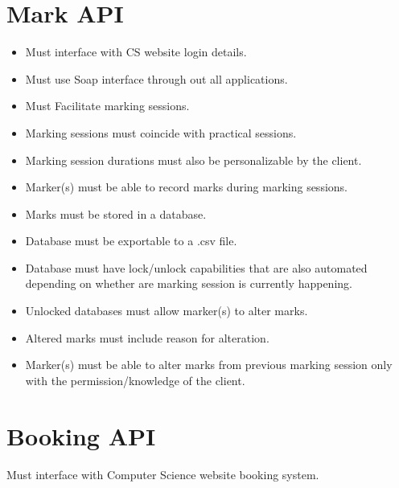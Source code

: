 \documentclass[10pt,a4paper]{article}
\begin{document}
	\section*{Mark API}
	\begin{itemize}
		\item Must interface with CS website login details.
		\item Must use Soap interface through out all applications.
		\item Must Facilitate marking sessions.
		\item Marking sessions must coincide with practical sessions.
		\item Marking session durations must also be personalizable by the client.
		\item Marker(s) must be able to record marks during marking sessions.
		\item Marks must be stored in a database.
		\item Database must be exportable to a .csv file.
		\item Database must have lock/unlock capabilities that are also automated depending on whether are marking session is currently happening.
		\item Unlocked databases must allow marker(s) to alter marks.
		\item Altered marks must include reason for alteration.
		\item Marker(s) must be able to alter marks from previous marking session only with the permission/knowledge of the client.
	\end{itemize}
		
	\section*{Booking API}
	Must interface with Computer Science website booking system.
	
	
\end{document}
